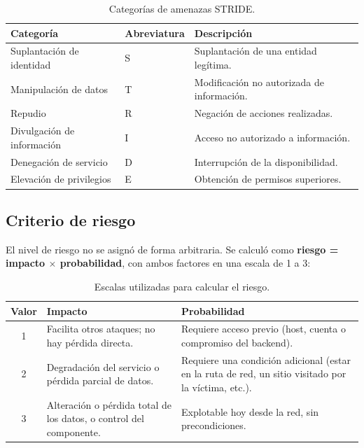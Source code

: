 \begin{table}[H]
\centering
\caption{Categorías de amenazas STRIDE.}
\label{tab:stride}

\begin{tabularx}{\textwidth}{l l X}
\toprule
\textbf{Categoría} &
\textbf{Abreviatura} &
\textbf{Descripción} \\
\midrule
Suplantación de identidad & S &
Suplantación de una entidad legítima. \\

Manipulación de datos & T &
Modificación no autorizada de información. \\

Repudio & R &
Negación de acciones realizadas. \\

Divulgación de información & I &
Acceso no autorizado a información. \\

Denegación de servicio & D &
Interrupción de la disponibilidad. \\

Elevación de privilegios & E &
Obtención de permisos superiores. \\
\bottomrule
\end{tabularx}
\end{table}

\subsection{Criterio de riesgo}

El nivel de riesgo no se asignó de forma arbitraria. Se calculó como
\textbf{riesgo = impacto $\times$ probabilidad}, con ambos factores en una
escala de 1 a 3:

\begin{table}[H]
\centering
\caption{Escalas utilizadas para calcular el riesgo.}
\label{tab:criterio-riesgo}

\begin{tabularx}{\textwidth}{c X X}
\toprule
\textbf{Valor} &
\textbf{Impacto} &
\textbf{Probabilidad} \\
\midrule
1 &
Facilita otros ataques; no hay pérdida directa. &
Requiere acceso previo (host, cuenta o compromiso del backend). \\

2 &
Degradación del servicio o pérdida parcial de datos. &
Requiere una condición adicional (estar en la ruta de red, un sitio
visitado por la víctima, etc.). \\

3 &
Alteración o pérdida total de los datos, o control del componente. &
Explotable hoy desde la red, sin precondiciones. \\
\bottomrule
\end{tabularx}
\end{table}

